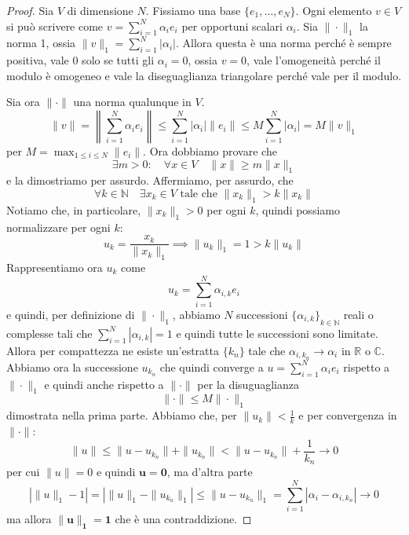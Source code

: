 \begin{proof}
    Sia \(V\) di dimensione \(N\). Fissiamo una base \(\{e_{1}, \ldots,
    e_{N}\}\). Ogni elemento \(v \in V\) si può scrivere come \(v =
    \sum_{i=1}^{N} \alpha_{i}e_{i}\) per opportuni scalari \(\alpha_i\). Sia
    \(\|\cdot \|_1\) la norma 1, ossia \(\|v\|_1 = \sum_{i=1}^{N}
    |\alpha_{i}|\). Allora questa è una norma perché è sempre positiva, vale 0
    solo se tutti gli \(\alpha_{i} = 0\), ossia \(v = 0\), vale l'omogeneità
    perché il modulo è omogeneo e vale la diseguaglianza triangolare perché vale
    per il modulo.

    Sia ora \(\|\cdot \|\) una norma qualunque in \(V\).
    \[
        \|v\| = \left\| \sum_{i=1}^{N} \alpha_{i}e_{i} \right\| \le
        \sum_{i=1}^{N} |\alpha_{i}|\|e_{i}\| \le M \sum_{i=1}^{N} |\alpha_{i}| =
        M \|v\|_1
    \]
    per \(\displaystyle M = \max_{1 \le i \le N} \|e_{i}\| \). Ora dobbiamo
    provare che
    \[
        \exists m > 0: \quad \forall x \in V \quad \|x\| \ge m \|x\|_1
    \]
    e la dimostriamo per assurdo. Affermiamo, per assurdo, che 
    \[
        \forall k \in \mathbb{N} \quad \exists x_k \in V \text{ tale che } \|x_k\|_1 > k
        \|x_k\|
    \]
    Notiamo che, in particolare, \(\|x_k\|_1 > 0\) per ogni \(k\), quindi possiamo normalizzare per
    ogni \(k\): 
    \[
        u_k = \frac{x_k}{\|x_k\|_1} \implies \|u_k\|_1 = 1 > k \|u_k\|
    \]
    Rappresentiamo ora \(u_k\) come
    \[
        u_k = \sum_{i=1}^{N} \alpha_{i,k}e_{i} 
    \]
e quindi, per definizione di \(\| \cdot \|_1\), abbiamo \(N\) successioni \({\{\alpha_{i,k}\}}_{k \in \mathbb{N}}\)
    reali o complesse tali che \(\sum_{i=1}^{N} |\alpha_{i,k}| = 1\) e quindi
    tutte le successioni sono limitate. Allora per compattezza ne esiste
    un'estratta \(\{k_n\} \) tale che \(\alpha_{i, k_n} \to \alpha_{i}\) in
    \(\mathbb{R}\) o \(\mathbb{C}\). Abbiamo ora la successione \(u_{k_n}\) che
    quindi converge a \(u = \sum_{i=1}^{N} \alpha_{i}e_{i}\) rispetto a \(\|\cdot \|_1\) e quindi anche rispetto a 
    \(\|\cdot \|\) per la disuguaglianza 
    \[\|\cdot \| \le M \|\cdot \|_1\] 
    dimostrata nella prima parte. Abbiamo che, per \(\|u_k \| < \frac{1}{k}\) e
    per convergenza in \(\| \cdot \|\): 
    \[
        \|u\| \le \|u - u_{k_n} \| + \|u_{k_n} \| < \|u - u_{k_n} \| +
        \frac{1}{k_n} \to 0
    \]
    per cui \(\|u\| = 0\) e quindi \(\mathbf{u = 0}\), ma d'altra parte
    \[
        \left| \|u\|_1 - 1 \right| = \left| \|u\|_1 - \|u_{k_n} \|_1 \right| \le
        \|u - u_{k_n} \|_1 = \sum_{i=1}^{N} |\alpha_{i} - \alpha_{i, k_n}| \to 0 
    \]
    ma allora \(\mathbf{\|u\|_1 = 1}\) che è una contraddizione.
\end{proof}

